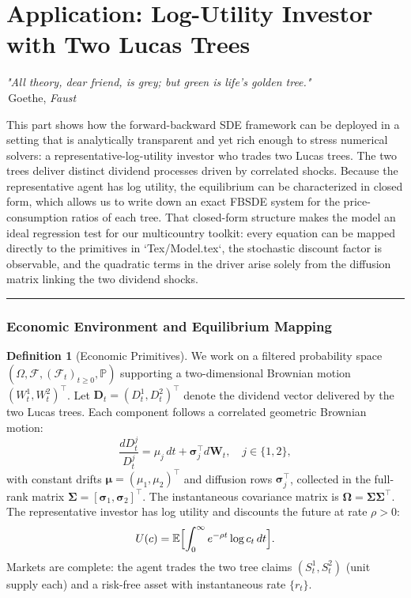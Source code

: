\documentclass[11pt,letterpaper,oneside]{article}
\theoremstyle{plain}
\theoremstyle{definition}
\newtheorem{definition}[theorem]{Definition}
\theoremstyle{remark}
\begin{document}
\clearpage
\newpage
\part{Application: Log-Utility Investor with Two Lucas Trees}
\label{part:finance}

\begin{center}
\textit{"All theory, dear friend, is grey; but green is life's golden tree."}\\
\textemdash\,Goethe, \emph{Faust}
\end{center}

This part shows how the forward-backward SDE framework can be deployed in a setting that is analytically transparent and yet rich enough to stress numerical solvers: a representative-log-utility investor who trades two Lucas trees. The two trees deliver distinct dividend processes driven by correlated shocks. Because the representative agent has log utility, the equilibrium can be characterized in closed form, which allows us to write down an exact FBSDE system for the price-consumption ratios of each tree. That closed-form structure makes the model an ideal regression test for our multicountry toolkit: every equation can be mapped directly to the primitives in `Tex/Model.tex`, the stochastic discount factor is observable, and the quadratic terms in the driver arise solely from the diffusion matrix linking the two dividend shocks.

\bigskip
\hrule
\bigskip

\section{Economic Environment and Equilibrium Mapping}
\label{sec:two_tree_environment}

\begin{definition}[Economic Primitives]
We work on a filtered probability space $(\Omega,\mathcal F,(\mathcal F_t)_{t\ge 0},\mathbb P)$ supporting a two-dimensional Brownian motion $(W^1_t,W^2_t)^\top$. Let $\bm{D}_t = (D^1_t,D^2_t)^\top$ denote the dividend vector delivered by the two Lucas trees. Each component follows a correlated geometric Brownian motion:
\begin{equation}
\label{eq:two_tree_dividends}
  \frac{dD^j_t}{D^j_t} = \mu_j\,dt + \bm{\sigma}_j^\top d\bm{W}_t, \quad j\in\{1,2\},
\end{equation}
with constant drifts $\bm{\mu}=(\mu_1,\mu_2)^\top$ and diffusion rows $\bm{\sigma}_j^\top$, collected in the full-rank matrix $\bm{\Sigma} = [\bm{\sigma}_1,\bm{\sigma}_2]^\top$. The instantaneous covariance matrix is $\bm{\Omega} = \bm{\Sigma}\bm{\Sigma}^\top$. The representative investor has log utility and discounts the future at rate $\rho>0$:
\begin{equation}
\label{eq:log_utility_preferences}
  U(c) = \mathbb{E}\Bigl[ \int_0^\infty e^{-\rho t} \log c_t\,dt \Bigr].
\end{equation}
Markets are complete: the agent trades the two tree claims $(S^1_t,S^2_t)$ (unit supply each) and a risk-free asset with instantaneous rate $\{r_t\}$.
\end{definition}
\end{document}
